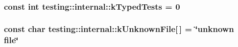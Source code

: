\subsubsection[{k\+Typed\+Tests}]{\setlength{\rightskip}{0pt plus 5cm}const int testing\+::internal\+::k\+Typed\+Tests = 0}\label{namespacetesting_1_1internal_a53ee2d113744f9ba1d89469db4d7388b}
\hypertarget{namespacetesting_1_1internal_abae7a5775c901f2fd12b058b00d09840}{}
\subsubsection[{k\+Unknown\+File}]{\setlength{\rightskip}{0pt plus 5cm}const char testing\+::internal\+::k\+Unknown\+File\mbox{[}$\,$\mbox{]} = \char`\"{}unknown file\char`\"{}}\label{namespacetesting_1_1internal_abae7a5775c901f2fd12b058b00d09840}
